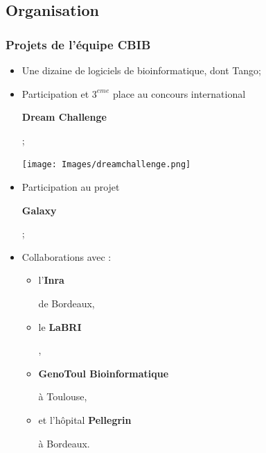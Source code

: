 \documentclass{beamer}
\begin{document}
\subsection{Organisation}


\begin{frame}
\frametitle{Projets de l'équipe CBIB}

\begin{itemize}
\item Une dizaine de logiciels de bioinformatique, dont \alert{Tango};
\item Participation et $3^{eme}$ place au concours international
\begin{flushcenter}\bf Dream Challenge \end{flushcenter};

\begin{center}
\texttt{[image: Images/dreamchallenge.png]}
\end{center}

\item Participation au projet
\begin{flushcenter}\bf Galaxy \end{flushcenter};
\item Collaborations avec :
     \begin{itemize}
     \item 
      \begin{flushcenter} l'\bf Inra\end{flushcenter} de Bordeaux, 
     \item 
     \begin{flushcenter} le \bf LaBRI\end{flushcenter}, 
     \item  
     \begin{flushcenter} \bf GenoToul Bioinformatique\end{flushcenter} à Toulouse, 
     \item 
     \begin{flushcenter} et l'hôpital \bf Pellegrin\end{flushcenter} à Bordeaux.
     \end{itemize}
\end{itemize}

\end{frame}
\end{document}
